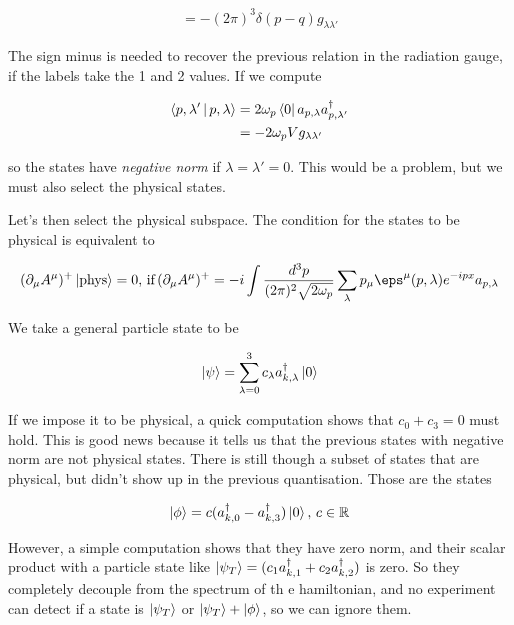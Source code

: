 \documentclass{report}
\begin{document}
\begin{align}
    [a_{p, \lambda}, a^\dagger_{q, \lambda'}] = -(2\pi)^3\delta(p-q)g_{\lambda\lambda'}
\end{align}

The sign minus is needed to recover the previous relation in the radiation gauge, if the labels take the 1 and 2 values. If we compute 

\begin{align}
    \Braket{p, \lambda' | p, \lambda} &= 2\omega_p \bra{0}a_{p, \lambda}a^\dagger_{p, \lambda'} \\
    &= -2\omega_p V g_{\lambda\lambda'}
\end{align}

so the states have \emph{negative norm} if \(\lambda = \lambda' = 0\). This would be a problem, but we must also select the physical states. 

Let's then select the physical subspace. The condition for the states to be physical is equivalent to 

\begin{align}
    (\partial_\mu A^\mu)^+\ket{\text{phys}} = 0, \, \text{if} \, (\partial_\mu A^\mu)^+ = -i\int \frac{d^3p}{(2\pi)^2\sqrt{2\omega_p}}\sum_\lambda p_\mu \eps^\mu(p, \lambda)e^{-ipx}a_{p, \lambda}
\end{align}

We take a general particle state to be 

\begin{align}
    \ket{\psi} = \sum_{\lambda=0}^3 c_\lambda a^\dagger_{k, \lambda}\ket{0}
\end{align}

If we impose it to be physical, a quick computation shows that \(c_0 + c_3 = 0\) must hold. This is good news because it tells us that the previous states with negative norm are not physical states. There is still though a subset of states that are physical, but didn't show up in the previous quantisation. Those are the states 

\begin{align}
    \ket{\phi} = c(a^\dagger_{k,0} - a^\dagger_{k,3})\ket{0}, \, c \in \mathbb{R}
\end{align}

However, a simple computation shows that they have zero norm, and their scalar product with a particle state like \(\ket{\psi_T} = (c_1a^\dagger_{k,1} + c_2a^\dagger_{k,2})\) is zero. So they completely decouple from the spectrum of th e hamiltonian, and no experiment can detect if a state is \(\ket{\psi_T}\) or \(\ket{\psi_T} + \ket{\phi}\), so we can ignore them. 
\end{document}
